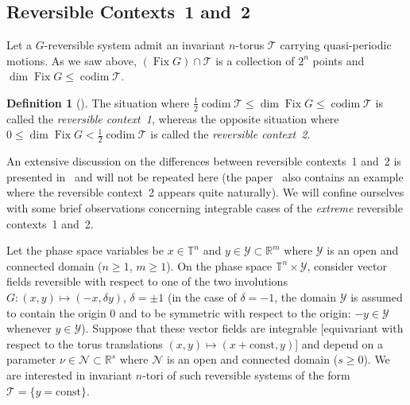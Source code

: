 \documentclass[12pt,reqno]{amsart}
\theoremstyle{definition}
\newtheorem{defn}{Definition}
\begin{document}
\subsection{Reversible Contexts~1 and~2}\label{context}

Let a $G$-reversible system admit an invariant $n$-torus ${\mathcal T}$ carrying
quasi-periodic motions. As we saw above, $(\operatorname{Fix} G)\cap{\mathcal T}$ is a collection of
$2^n$ points and $\dim\operatorname{Fix} G{\leqslant}\operatorname{codim}{\mathcal T}$.

\begin{defn}[\cite{BHS96Gro,BHS96LNM,S08,S11}]\label{defcont}
The situation where $\frac{1}{2}\operatorname{codim}{\mathcal T}{\leqslant}\dim\operatorname{Fix} G{\leqslant}\operatorname{codim}{\mathcal T}$ is
called the \emph{reversible context~1}, whereas the opposite situation where
$0{\leqslant}\dim\operatorname{Fix} G<\frac{1}{2}\operatorname{codim}{\mathcal T}$ is called the \emph{reversible
context~2}.
\end{defn}

An extensive discussion on the differences between reversible contexts~1 and~2
is presented in~\cite{S11} and will not be repeated here (the paper~\cite{S11}
also contains an example where the reversible context~2 appears quite
naturally). We will confine ourselves with some brief observations concerning
integrable cases of the \emph{extreme} reversible contexts~1 and~2.

Let the phase space variables be $x\in{\mathbb T}^n$ and $y\in{\mathcal Y}\subset{\mathbb R}^m$ where
${\mathcal Y}$ is an open and connected domain ($n{\geqslant} 1$, $m{\geqslant} 1$). On the phase
space ${\mathbb T}^n\times{\mathcal Y}$, consider vector fields reversible with respect to one
of the two involutions $G:(x,y)\mapsto(-x,\delta y)$, $\delta=\pm 1$ (in the
case of $\delta=-1$, the domain ${\mathcal Y}$ is assumed to contain the origin $0$ and
to be symmetric with respect to the origin: $-y\in{\mathcal Y}$ whenever $y\in{\mathcal Y}$).
Suppose that these vector fields are integrable [equivariant with respect to
the torus translations $(x,y)\mapsto(x+{\mathrm{const}},y)$] and depend on a parameter
$\nu\in{\mathcal N}\subset{\mathbb R}^s$ where ${\mathcal N}$ is an open and connected domain
($s{\geqslant} 0$). We are interested in invariant $n$-tori of such reversible
systems of the form ${\mathcal T}=\{y={\mathrm{const}}\}$.
\end{document}
